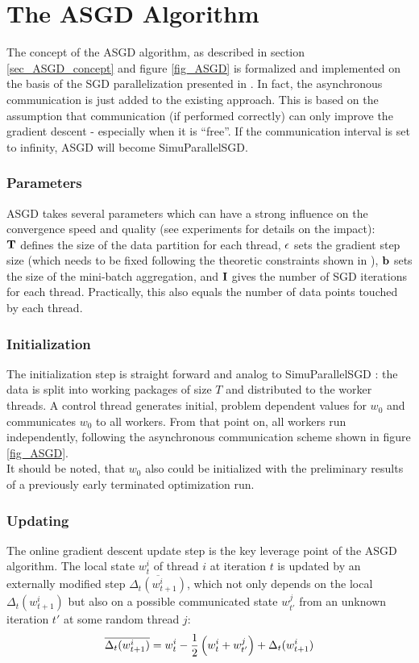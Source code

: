 \documentclass{acm_proc_article-sp}
\begin{document}
\section{The ASGD Algorithm} \label{sec_asgd} 
The concept of the ASGD algorithm, as described in section \ref{sec_ASGD_concept} 
and figure \ref{fig_ASGD} is formalized and implemented on the basis of the SGD 
parallelization presented in \cite{SGDsmola}. In fact, the asynchronous communication is 
just added to the existing approach. This is based on the assumption that communication 
(if performed correctly) can only improve the gradient descent - especially when it 
is ``free''. If the communication interval is set to infinity, ASGD will become 
SimuParallelSGD.    
\subsubsection*{Parameters}
ASGD takes several parameters which can have a strong influence on the convergence 
speed and quality (see experiments for details on the impact):\\
$\bf T$ defines the size of the data partition for each thread,
$\bf \epsilon$ sets the gradient step size (which needs to be fixed following
the theoretic constraints shown in \cite{SGDsmola}),
$\bf b$ sets the size of the  mini-batch aggregation, and
$\bf I$ gives the number of SGD iterations for each thread. Practically, this also equals the number 
of data points touched by each thread.

\subsubsection*{Initialization} 
The initialization step is straight forward and analog to SimuParallelSGD \cite{SGDsmola}
: the data is split into working packages of size $T$ and distributed to the 
worker threads. A control thread generates initial, problem dependent values for $w_0$
and communicates $w_0$ to all workers. From that point on, all workers run 
independently, following the asynchronous communication scheme shown in figure
\ref{fig_ASGD}.\\
It should be noted, that $w_0$ also could be initialized with the 
preliminary results of a previously early terminated optimization run.      

\subsubsection*{Updating}
The online gradient descent update step is the key leverage point of the ASGD 
algorithm. The local state $w^i_t$ of thread $i$ at iteration $t$ is updated 
by an externally modified step $\overline{\Delta_t(w^i_{t+1})}$, which not
only depends on the local $\Delta_t(w^i_{t+1})$ but also on a possible
communicated state $w^j_{t'}$ from an unknown iteration $t'$ at some random thread $j$:   
\begin{equation}
\overline{\Delta_t(w^i_{t+1})}=w^i_t-{1\over 2}\left( w^i_t + w^j_{t'} \right) + \Delta_t(w^i_{t+1})
\label{eq_ASGD_1}
\end{equation}
\end{document}
